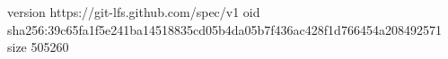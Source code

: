 version https://git-lfs.github.com/spec/v1
oid sha256:39c65fa1f5e241ba14518835cd05b4da05b7f436ac428f1d766454a208492571
size 505260
